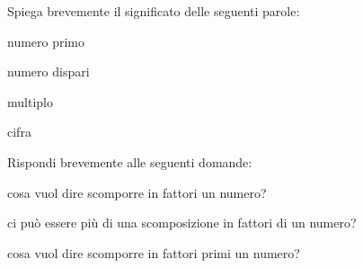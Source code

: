 \begin{htmulticols}{2}
\begin{esercizio}
Spiega brevemente il significato delle seguenti parole:
 \begin{enumeratees}
 \item numero primo
 \item numero dispari
 \item multiplo
 \item cifra
 \end{enumeratees}
\end{esercizio}

\begin{esercizio}
Rispondi brevemente alle seguenti domande:
 \begin{enumeratees}
 \item cosa vuol dire scomporre in fattori un numero?
 \item ci può essere più di una scomposizione in fattori di un numero?
 \item cosa vuol dire scomporre in fattori primi un numero?
 \end{enumeratees}
\end{esercizio}

\end{htmulticols}
